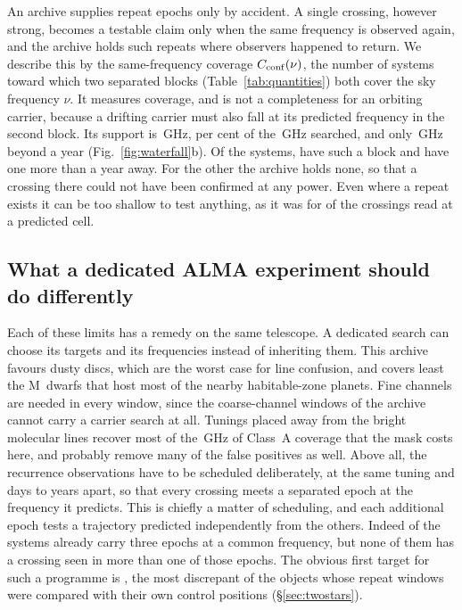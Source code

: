 An archive supplies repeat epochs only by accident. A single crossing,
however strong, becomes a testable claim only when the same frequency is
observed again, and the archive holds such repeats where observers happened
to return. We describe this by the same-frequency coverage
$C_{\rm conf}(\nu)$, the number of systems toward which two separated blocks
(Table~\ref{tab:quantities}) both cover the sky frequency $\nu$. It measures
coverage, and is not a completeness for an orbiting carrier, because a
drifting carrier must also fall at its predicted frequency in the second
block. Its support is \CvConfGHzDay\,GHz, \CvConfPctDay{} per cent of the
\CvUnionA\,GHz searched, and only \CvConfGHzYr\,GHz beyond a year
(Fig.~\ref{fig:waterfall}b). Of the \NSysClassA{} systems, \ZcConfSysDay{}
have such a block and \ZcConfSysYr{} have one more than a year away. For the
other \ZcNoRepSys{} the archive holds none, so that a crossing there could
not have been confirmed at any power. Even where a repeat exists it can be
too shallow to test anything, as it was for \HjNPowerLo{} of the \RcNExcl{}
crossings read at a predicted cell.

\subsection{What a dedicated ALMA experiment should do differently}
\label{sec:future}

Each of these limits has a remedy on the same telescope. A dedicated search
can choose its targets and its frequencies instead of inheriting them. This
archive favours dusty discs, which are the worst case for line confusion, and
covers least the M~dwarfs that host most of the nearby habitable-zone
planets. Fine channels are needed in every window, since the \NCoarse{}
coarse-channel windows of the archive cannot carry a carrier search at all.
Tunings placed away from the bright molecular lines recover most of the
\MkMaskAGHz\,GHz of Class~A coverage that the mask costs here, and probably
remove many of the false positives as well. Above all, the recurrence
observations have to be scheduled deliberately, at the same tuning and days
to years apart, so that every crossing meets a separated epoch at the
frequency it predicts. This is chiefly a matter of scheduling, and each
additional epoch tests a trajectory predicted independently from the others.
Indeed \PaNSysThree{} of the \NSysClassA{} systems already carry three epochs
at a common frequency, but none of them has a crossing seen in more than one
of those epochs. The obvious first target for such a programme is \BkAlmaName, the most
discrepant of the objects whose repeat windows were compared with their own
control positions (\S\ref{sec:twostars}).
